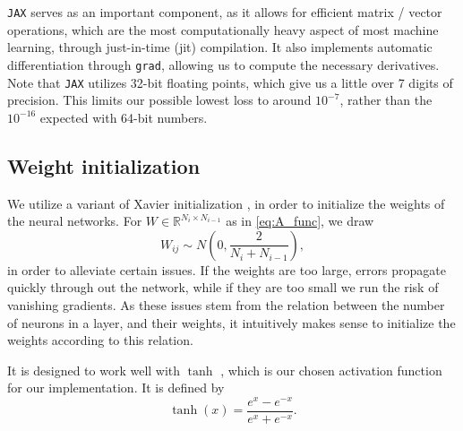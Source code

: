 \verb|JAX| serves as an important component, as it allows for efficient matrix / vector operations, which are the most computationally heavy aspect of most machine learning, through just-in-time (jit) compilation.
It also implements automatic differentiation through \verb|grad|, allowing us to compute the necessary derivatives.
Note that \verb|JAX| utilizes 32-bit floating points, which give us a little over 7 digits of precision.
This limits our possible lowest loss to around $10^{-7}$, rather than the $10^{-16}$ expected with 64-bit numbers.

\subsection{Weight initialization}
We utilize a variant of Xavier initialization \cite{Glorot2010UnderstandingTD}, in order to initialize the weights of the neural networks.
For $W \in \mathbb{R}^{N_i \times N_{i-1}}$ as in \eqref{eq:A_func}, we draw
\begin{equation}
    W_{ij} \sim N\left(0, \frac{2}{N_i + N_{i-1}} \right),
\end{equation}
in order to alleviate certain issues.
If the weights are too large, errors propagate quickly through out the network, while if they are too small we run the risk of vanishing gradients.
As these issues stem from the relation between the number of neurons in a layer, and their weights, it intuitively makes sense to initialize the weights according to this relation.

It is designed to work well with $\tanh$ \cite{tanhXavier}, which is our chosen activation function for our implementation.
It is defined by
\begin{equation}
    \tanh(x) = \frac{e^x - e^{-x}}{e^x + e^{-x}}.
\end{equation}
\begin{comment}
seen in \autoref{fig:tanh}.

\begin{figure}[h]
    
    \caption{Tanh activation function, for $x \in [-2, 2]$.}
    \label{fig:tanh}
\end{figure}
\end{comment}